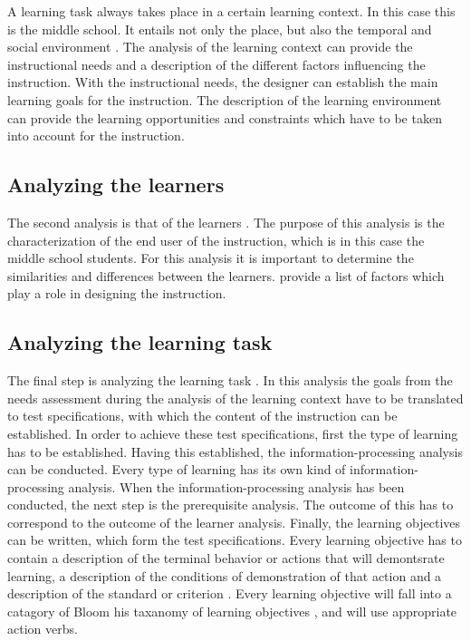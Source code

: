 \documentclass[12pt]{report} %
\begin{document}
A learning task always takes place in a certain learning context. In this case this is the middle school. It entails not only the place, but also the temporal and social environment \cite{smithragan}. The analysis of the learning context can provide the instructional needs and a description of the different factors influencing the instruction. With the instructional needs, the designer can establish the main learning goals for the instruction. The description of the learning environment can provide the learning opportunities and constraints which have to be taken into account for the instruction.

\subsection{Analyzing the learners}

The second analysis is that of the learners \cite{smithragan}. The purpose of this analysis is the characterization of the end user of the instruction, which is in this case the middle school students. For this analysis it is important to determine the similarities and differences between the learners.  provide a list of factors which play a role in designing the instruction.

\subsection{Analyzing the learning task}

The final step is analyzing the learning task \cite{smithragan}. In this analysis the goals from the needs assessment during the analysis of the learning context have to be translated to test specifications, with which the content of the instruction can be established. In order to achieve these test specifications, first the type of learning has to be established. Having this established, the information-processing analysis can be conducted. Every type of learning has its own kind of information-processing analysis. When the information-processing analysis has been conducted, the next step is the prerequisite analysis. The outcome of this has to correspond to the outcome of the learner analysis. Finally, the learning objectives can be written, which form the test specifications. Every learning objective has to contain a description of the terminal behavior or actions that will demontsrate learning, a description of the conditions of demonstration of that action and a description of the standard or criterion \cite{smithragan}. Every learning objective will fall into a catagory of Bloom his taxanomy of learning objectives \cite{bloom}, and will use appropriate action verbs.
\end{document}
